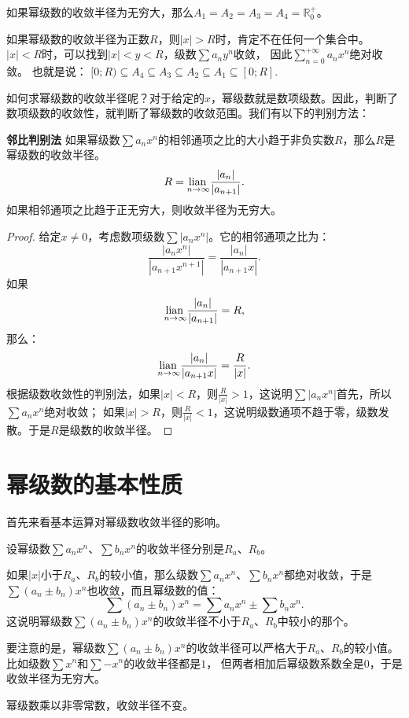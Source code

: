 \documentclass[12pt,UTF8,fontset=none]{ctexbook}
\begin{document}
\begin{appendix}
如果幂级数的收敛半径为无穷大，那么$A_1 = A_2 = A_3 = A_4 = \mathbb{R}_0^+$。

如果幂级数的收敛半径为正数$R$，则$|x|>R$时，肯定不在任何一个集合中。$|x|<R$时，可以找到$|x|<y<R$，级数$\sum a_n y^n$收敛，
因此$\sum_{n=0}^{+\infty} a_n x^n$绝对收敛。
也就是说：
$[0;R) \subseteq A_4\subseteq A_3 \subseteq A_2\subseteq A_1 \subseteq [0;R].$

如何求幂级数的收敛半径呢？对于给定的$x$，幂级数就是数项级数。因此，判断了数项级数的收敛性，就判断了幂级数的收敛范围。我们有以下的判别方法：

\begin{tm}{\textbf{邻比判别法}}
    如果幂级数$\sum a_n x^n$的相邻通项之比的大小趋于非负实数$R$，那么$R$是幂级数的收敛半径。
    $$ R = \underset{n\to\infty}{\operatorname{lian}\,} \frac{|a_n|}{|a_{n+1}|}. $$
    如果相邻通项之比趋于正无穷大，则收敛半径为无穷大。
\end{tm}

\begin{proof}
    给定$x\neq 0$，考虑数项级数$\sum |a_n x^n|$。它的相邻通项之比为：
    $$ \frac{|a_n x^n|}{|a_{n+1} x^{n+1}|} = \frac{|a_n|}{|a_{n+1}x|}. $$
    如果
    $$ \underset{n\to\infty}{\operatorname{lian}\,} \frac{|a_n|}{|a_{n+1}|} = R,$$
    那么：
    $$ \underset{n\to\infty}{\operatorname{lian}\,} \frac{|a_n|}{|a_{n+1}x|} = \frac{R}{|x|}.$$
    根据级数收敛性的判别法，如果$|x|<R$，则$\frac{R}{|x|} > 1$，这说明$\sum |a_n x^n|$首先，所以$\sum a_n x^n$绝对收敛；
    如果$|x|>R$，则$\frac{R}{|x|} < 1$，这说明级数通项不趋于零，级数发散。于是$R$是级数的收敛半径。
\end{proof}

\section{幂级数的基本性质}

首先来看基本运算对幂级数收敛半径的影响。

设幂级数$\sum a_n x^n$、$\sum b_n x^n$的收敛半径分别是$R_a$、$R_b$。

如果$|x|$小于$R_a$、$R_b$的较小值，那么级数$\sum a_n x^n$、$\sum b_n x^n$都绝对收敛，于是
$\sum (a_n \pm b_n) x^n$也收敛，而且幂级数的值：
$$\sum (a_n \pm b_n) x^n = \sum a_n x^n \pm \sum b_n x^n.$$
这说明幂级数$\sum (a_n \pm b_n) x^n$的收敛半径不小于$R_a$、$R_b$中较小的那个。

要注意的是，幂级数$\sum (a_n \pm b_n) x^n$的收敛半径可以严格大于$R_a$、$R_b$的较小值。比如级数$\sum x^n$和$\sum -x^n$的收敛半径都是$1$，
但两者相加后幂级数系数全是$0$，于是收敛半径为无穷大。

幂级数乘以非零常数，收敛半径不变。


\end{appendix}
\end{document}
